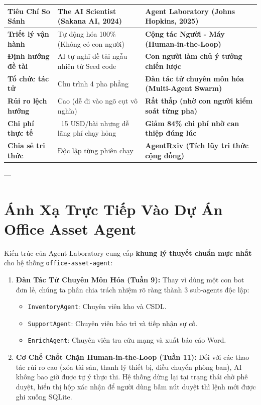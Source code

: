 \documentclass[11pt,a4paper]{article}
\begin{document}
\begin{table}[H]
\centering
\small
\begin{tabularx}{\textwidth}{lXX}
\toprule
\textbf{Tiêu Chí So Sánh} & \textbf{The AI Scientist (Sakana AI, 2024)} & \textbf{Agent Laboratory (Johns Hopkins, 2025)} \\
\midrule
\textbf{Triết lý vận hành} & Tự động hóa 100\% (Không có con người) & \textbf{Cộng tác Người - Máy (Human-in-the-Loop)} \\
\textbf{Định hướng đề tài} & AI tự nghĩ đề tài ngẫu nhiên từ Seed code & \textbf{Con người làm chủ ý tưởng chiến lược} \\
\textbf{Tổ chức tác tử} & Chu trình 4 pha phẳng & \textbf{Đàn tác tử chuyên môn hóa (Multi-Agent Swarm)} \\
\textbf{Rủi ro lệch hướng} & Cao (dễ đi vào ngõ cụt vô nghĩa) & \textbf{Rất thấp (nhờ con người kiểm soát từng pha)} \\
\textbf{Chi phí thực tế} & ~15 USD/bài nhưng dễ lãng phí chạy hỏng & \textbf{Giảm 84\% chi phí nhờ can thiệp đúng lúc} \\
\textbf{Chia sẻ tri thức} & Độc lập từng phiên chạy & \textbf{AgentRxiv (Tích lũy tri thức cộng đồng)} \\
\bottomrule
\end{tabularx}
\end{table}

---

\section{Ánh Xạ Trực Tiếp Vào Dự Án Office Asset Agent}

Kiến trúc của Agent Laboratory cung cấp \textbf{khung lý thuyết chuẩn mực nhất} cho hệ thống \texttt{office-asset-agent}:

\begin{enumerate}[leftmargin=1.8em]
    \item \textbf{Đàn Tác Tử Chuyên Môn Hóa (Tuần 9):} Thay vì dùng một con bot đơn lẻ, chúng ta phân chia trách nhiệm rõ ràng thành 3 sub-agents độc lập:
    \begin{itemize}
        \item \texttt{InventoryAgent}: Chuyên viên kho và CSDL.
        \item \texttt{SupportAgent}: Chuyên viên bảo trì và tiếp nhận sự cố.
        \item \texttt{EnrichAgent}: Chuyên viên tra cứu mạng và xuất báo cáo Word.
    \end{itemize}
    \item \textbf{Cơ Chế Chốt Chặn Human-in-the-Loop (Tuần 11):} Đối với các thao tác rủi ro cao (xóa tài sản, thanh lý thiết bị, điều chuyển phòng ban), AI không bao giờ được tự ý thực thi. Hệ thống dừng lại tại trạng thái chờ phê duyệt, hiển thị hộp xác nhận để người dùng bấm nút duyệt thì lệnh mới được ghi xuống SQLite.
\end{enumerate}
\end{document}
